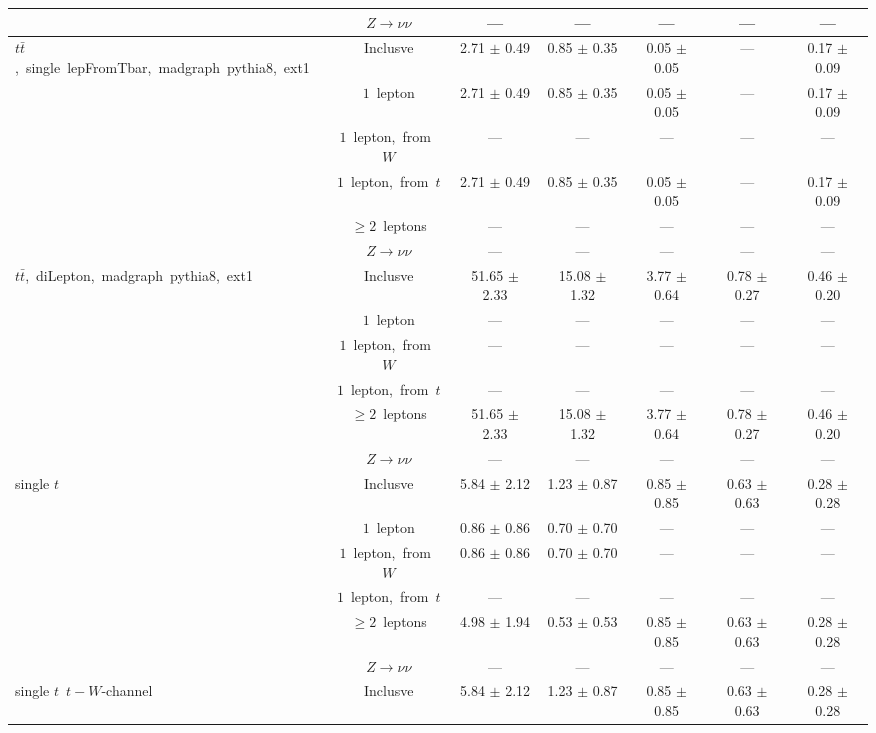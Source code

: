 \documentclass{article}
\begin{document}
\begin{longtable}{|l|c|c|c|c|c|c|}
 & $Z\rightarrow\nu\nu$  & ---  & ---  & ---  & ---  & --- \\* 
\hline 
\multirow{6}{*}{$t\bar{t}$,~single~lepFromTbar,~madgraph~pythia8,~ext1} & Inclusve  & 2.71 $\pm$ 0.49  & 0.85 $\pm$ 0.35  & 0.05 $\pm$ 0.05  & ---  & 0.17 $\pm$ 0.09 \\* 
 & $1$~lepton  & 2.71 $\pm$ 0.49  & 0.85 $\pm$ 0.35  & 0.05 $\pm$ 0.05  & ---  & 0.17 $\pm$ 0.09 \\* 
 & $1$~lepton,~from~$W$  & ---  & ---  & ---  & ---  & --- \\* 
 & $1$~lepton,~from~$t$  & 2.71 $\pm$ 0.49  & 0.85 $\pm$ 0.35  & 0.05 $\pm$ 0.05  & ---  & 0.17 $\pm$ 0.09 \\* 
 & $\ge2$~leptons  & ---  & ---  & ---  & ---  & --- \\* 
 & $Z\rightarrow\nu\nu$  & ---  & ---  & ---  & ---  & --- \\* 
\hline 
\multirow{6}{*}{$t\bar{t}$,~diLepton,~madgraph~pythia8,~ext1} & Inclusve  & 51.65 $\pm$ 2.33  & 15.08 $\pm$ 1.32  & 3.77 $\pm$ 0.64  & 0.78 $\pm$ 0.27  & 0.46 $\pm$ 0.20 \\* 
 & $1$~lepton  & ---  & ---  & ---  & ---  & --- \\* 
 & $1$~lepton,~from~$W$  & ---  & ---  & ---  & ---  & --- \\* 
 & $1$~lepton,~from~$t$  & ---  & ---  & ---  & ---  & --- \\* 
 & $\ge2$~leptons  & 51.65 $\pm$ 2.33  & 15.08 $\pm$ 1.32  & 3.77 $\pm$ 0.64  & 0.78 $\pm$ 0.27  & 0.46 $\pm$ 0.20 \\* 
 & $Z\rightarrow\nu\nu$  & ---  & ---  & ---  & ---  & --- \\* 
\hline 
\multirow{6}{*}{single $t$} & Inclusve  & 5.84 $\pm$ 2.12  & 1.23 $\pm$ 0.87  & 0.85 $\pm$ 0.85  & 0.63 $\pm$ 0.63  & 0.28 $\pm$ 0.28 \\* 
 & $1$~lepton  & 0.86 $\pm$ 0.86  & 0.70 $\pm$ 0.70  & ---  & ---  & --- \\* 
 & $1$~lepton,~from~$W$  & 0.86 $\pm$ 0.86  & 0.70 $\pm$ 0.70  & ---  & ---  & --- \\* 
 & $1$~lepton,~from~$t$  & ---  & ---  & ---  & ---  & --- \\* 
 & $\ge2$~leptons  & 4.98 $\pm$ 1.94  & 0.53 $\pm$ 0.53  & 0.85 $\pm$ 0.85  & 0.63 $\pm$ 0.63  & 0.28 $\pm$ 0.28 \\* 
 & $Z\rightarrow\nu\nu$  & ---  & ---  & ---  & ---  & --- \\* 
\hline 
\multirow{6}{*}{single $t$~$t-W$-channel} & Inclusve  & 5.84 $\pm$ 2.12  & 1.23 $\pm$ 0.87  & 0.85 $\pm$ 0.85  & 0.63 $\pm$ 0.63  & 0.28 $\pm$ 0.28 \\* 

\end{longtable}
\end{document}
